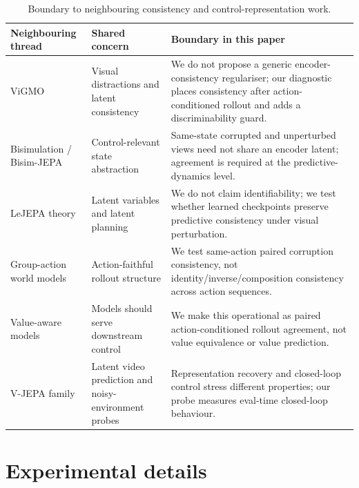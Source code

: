 \documentclass[10pt]{article}
\begin{document}
\begin{table}[H]
\centering
\caption{Boundary to neighbouring consistency and control-representation work.}
\label{tab:related-boundaries}
\small
\begin{tabularx}{\textwidth}{>{\raggedright\arraybackslash}p{}>{\raggedright\arraybackslash}p{}>{\raggedright\arraybackslash}X}
\toprule
Neighbouring thread & Shared concern & Boundary in this paper \\
\midrule
ViGMO~\cite{vigmo} & Visual distractions and latent consistency & We do not propose a generic encoder-consistency regulariser; our diagnostic places consistency after action-conditioned rollout and adds a discriminability guard. \\
Bisimulation / Bisim-JEPA~\cite{gelada2019deepmdp,zhang2021dbc,toso2026bisimjepa} & Control-relevant state abstraction & Same-state corrupted and unperturbed views need not share an encoder latent; agreement is required at the predictive-dynamics level. \\
LeJEPA theory~\cite{klindt2026lejepaworldmodel} & Latent variables and latent planning & We do not claim identifiability; we test whether learned checkpoints preserve predictive consistency under visual perturbation. \\
Group-action world models~\cite{wang2026groupactions} & Action-faithful rollout structure & We test same-action paired corruption consistency, not identity/inverse/composition consistency across action sequences. \\
Value-aware models~\cite{grimm2020valueequivalence,voelcker2025calibratedvalueaware} & Models should serve downstream control & We make this operational as paired action-conditioned rollout agreement, not value equivalence or value prediction. \\
V-JEPA family~\cite{bardes2024vjepa,assran2025vjepa2,huang2026vjepa} & Latent video prediction and noisy-environment probes & Representation recovery and closed-loop control stress different properties; our probe measures eval-time closed-loop behaviour. \\
\bottomrule
\end{tabularx}
\end{table}

\section{Experimental details}\label{sec:appendix-A}
\end{document}
